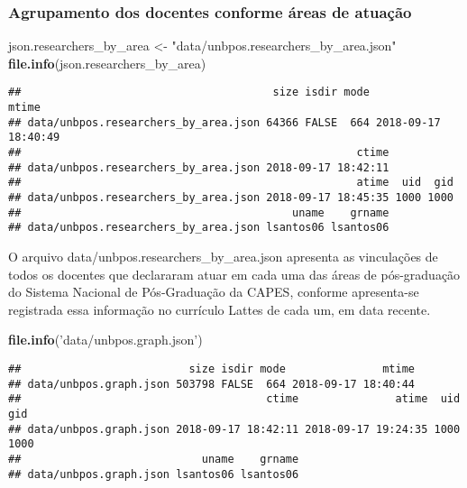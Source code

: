 \documentclass[]{article}
\newenvironment{Shaded}{\begin{snugshade}}{\end{snugshade}}
\newcommand{\KeywordTok}[1]{\textcolor[rgb]{0.13,0.29,0.53}{\textbf{#1}}}
\newcommand{\StringTok}[1]{\textcolor[rgb]{0.31,0.60,0.02}{#1}}
\newcommand{\NormalTok}[1]{#1}
\begin{document}
\subsubsection{Agrupamento dos docentes conforme áreas de
atuação}\label{agrupamento-dos-docentes-conforme-areas-de-atuacao}

\begin{Shaded}
\begin{Highlighting}[]
\NormalTok{json.researchers_by_area <-}\StringTok{ "data/unbpos.researchers_by_area.json"} 
\KeywordTok{file.info}\NormalTok{(json.researchers_by_area)}
\end{Highlighting}
\end{Shaded}

\begin{verbatim}
##                                       size isdir mode               mtime
## data/unbpos.researchers_by_area.json 64366 FALSE  664 2018-09-17 18:40:49
##                                                    ctime
## data/unbpos.researchers_by_area.json 2018-09-17 18:42:11
##                                                    atime  uid  gid
## data/unbpos.researchers_by_area.json 2018-09-17 18:45:35 1000 1000
##                                          uname    grname
## data/unbpos.researchers_by_area.json lsantos06 lsantos06
\end{verbatim}

O arquivo data/unbpos.researchers\_by\_area.json apresenta as
vinculações de todos os docentes que declararam atuar em cada uma das
áreas de pós-graduação do Sistema Nacional de Pós-Graduação da CAPES,
conforme apresenta-se registrada essa informação no currículo Lattes de
cada um, em data recente.

\begin{Shaded}
\begin{Highlighting}[]
\KeywordTok{file.info}\NormalTok{(}\StringTok{'data/unbpos.graph.json'}\NormalTok{)}
\end{Highlighting}
\end{Shaded}

\begin{verbatim}
##                          size isdir mode               mtime
## data/unbpos.graph.json 503798 FALSE  664 2018-09-17 18:40:44
##                                      ctime               atime  uid  gid
## data/unbpos.graph.json 2018-09-17 18:42:11 2018-09-17 19:24:35 1000 1000
##                            uname    grname
## data/unbpos.graph.json lsantos06 lsantos06
\end{verbatim}
\end{document}
